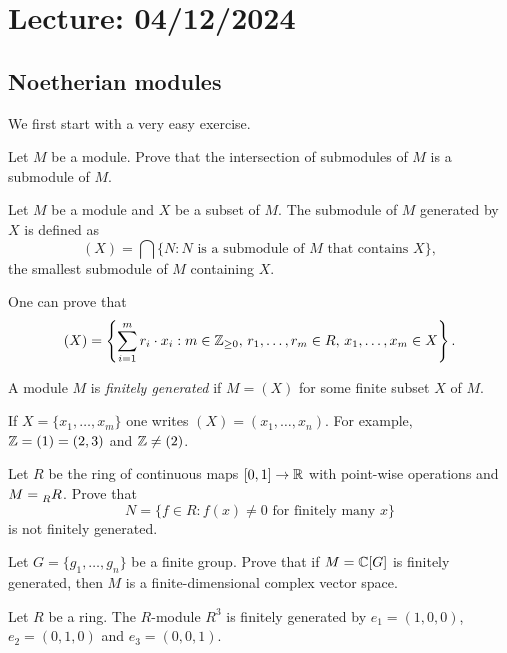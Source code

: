 \section{Lecture: 04/12/2024}

\subsection{Noetherian modules}

We first start with a very easy exercise. 

\begin{exercise}
\label{xca:modules_intersection}
    Let $M$ be a module. 
    Prove that the intersection of submodules of $M$ 
    is a submodule of $M$. 
\end{exercise}

\begin{definition}
Let $M$ be a module and $X$ be a subset of $M$. The submodule
of $M$ generated by $X$ is defined as
\[
(X)=\bigcap\{N:N\text{ is a submodule of $M$ that contains $X$}\},
\]
the smallest submodule of $M$ containing $X$. 
\end{definition}

One can prove that  
\[
(X)=\left\{\sum_{i=1}^mr_i\cdot x_i:m\in\mathbb{Z}_{\geq0},\,r_1,\dots,r_m\in R,\,x_1,\dots,x_m\in X\right\}.
\]

\begin{definition}
    A module $M$ is \emph{finitely generated} if $M=(X)$ for some finite subset $X$ of $M$.
\end{definition}

If $X=\{x_1,\dots,x_m\}$ one writes $(X)=(x_1,\dots,x_n)$.
For example, $\mathbb{Z}=(1)=(2,3)$ and $\mathbb{Z}\ne (2)$.

\begin{exercise}
    Let $R$ be the ring of continuous maps $[0,1]\to\mathbb{R}$ with point-wise operations and 
    $M=\prescript{}{R}{R}$. Prove that
    \[ 
    N=\{f\in R:f(x)\ne0\text{ for finitely many $x$}\}
    \]
    is not finitely generated. 
\end{exercise}

\begin{exercise}
    Let $G=\{g_1,\dots,g_n\}$ be a finite group. Prove that if $M=\mathbb{C}[G]$ is finitely generated, then
    $M$ is a finite-dimensional complex vector space. 
\end{exercise}

\begin{example}
    Let $R$ be a ring. The $R$-module $R^3$ is finitely generated 
    by $e_1=(1,0,0)$, $e_2=(0,1,0)$ and $e_3=(0,0,1)$. 
\end{example}

